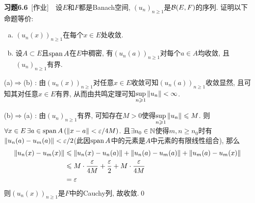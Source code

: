 	\textbf{习题6.6}\ [作业]\ \ 设$ E $和$ F $都是Banach空间, $ (u_n)_{n\geqslant 1} $是$ \mathcal{B}(E,F) $的序列. 证明以下命题等价:
	\begin{enumerate}[(a)]
	\item $ (u_n(x))_{n\geqslant 1} $在每个$ x\in E $处收敛.
	\item 设$ A\subset E $且$ \operatorname{span} A $在$ E $中稠密, 有$ (u_n(a))_{n\geqslant 1} $对每个$ a\in A $均收敛, 且$ (u_n)_{n\geqslant 1} $有界.
	\end{enumerate}
	\begin{Proof}
	(a)$ \Rightarrow $(b) : 由$ (u_n(x))_{n\geqslant 1} $对任意$ x\in E $收敛可知$ (u_n(a))_{n\geqslant 1} $收敛显然, 且可知其对任意$ x\in E $有界, 从而由共鸣定理可知$ \sup\limits_{n\geqslant 1}\left\| u_n \right\|<\infty $.
	
	(b)$ \Rightarrow $(a) : 由$ (u_n)_{n\geqslant 1} $有界, 可知存在$ M>0 $使得$ \sup\limits_{n\geqslant 1}\left\| u_n \right\|\leqslant M $. 则$ \forall x\in E\,\exists a\in\operatorname{span} A\,(\left\| x-a \right\|<\varepsilon/4M) $. 且$ \exists n_0\in\mathbb{N} $使得$ m,n\geqslant n_0 $时有$ \left\| u_n(a)-u_m(a) \right\|<\varepsilon/2 $(此因$ \operatorname{span} A $中的元素是$ A $中元素的有限线性组合), 那么
	\[
	\begin{aligned}
	\left\| u_n(x)-u_m(x) \right\|&\leqslant\left\| u_n(x)-u_n(a) \right\|+\left\| u_n(a)-u_m(a) \right\|+\left\| u_m(a)-u_m(x) \right\|\\
	&\leqslant M\cdot\frac{\varepsilon}{4M}+\frac{\varepsilon}{2}+M\cdot\frac{\varepsilon}{4M}\\
	&=\varepsilon
	\end{aligned}
	\]
	则$ (u_n(x))_{n\geqslant 1} $是$ F $中的Cauchy列, 故收敛.\qed
	\end{Proof}

